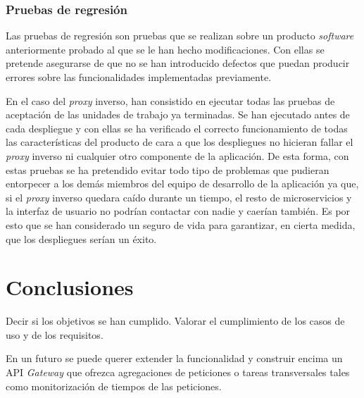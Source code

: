 \documentclass[11pt,spanish,listoffigures]{tfgetsinf}
\begin{document}

		\subsection{Pruebas de regresión} \label{pruebasDeRegresion}

Las pruebas de regresión son pruebas que se realizan sobre un producto \emph{software} anteriormente probado al que se le han hecho modificaciones. Con ellas se pretende asegurarse de que no se han introducido defectos que puedan producir errores sobre las funcionalidades implementadas previamente. 

En el caso del \emph{proxy} inverso, han consistido en ejecutar todas las pruebas de aceptación de las unidades de trabajo ya terminadas. Se han ejecutado antes de cada despliegue y con ellas se ha verificado el correcto funcionamiento de todas las características del producto de cara a que los despliegues no hicieran fallar el \emph{proxy} inverso ni cualquier otro componente de la aplicación. De esta forma, con estas pruebas se ha pretendido evitar todo tipo de problemas que pudieran entorpecer a los demás miembros del equipo de desarrollo de la aplicación ya que, si el \emph{proxy} inverso quedara caído durante un tiempo, el resto de microservicios y la interfaz de usuario no podrían contactar con nadie y caerían también. Es por esto que se han considerado un seguro de vida para garantizar, en cierta medida, que los despliegues serían un éxito.


\chapter{Conclusiones}

Decir si los objetivos se han cumplido. Valorar el cumplimiento de los casos de uso y de los requisitos.

En un futuro se puede querer extender la funcionalidad y construir encima un API \emph{Gateway} que ofrezca agregaciones de peticiones o tareas transversales tales como monitorización de tiempos de las peticiones.

\end{document}
